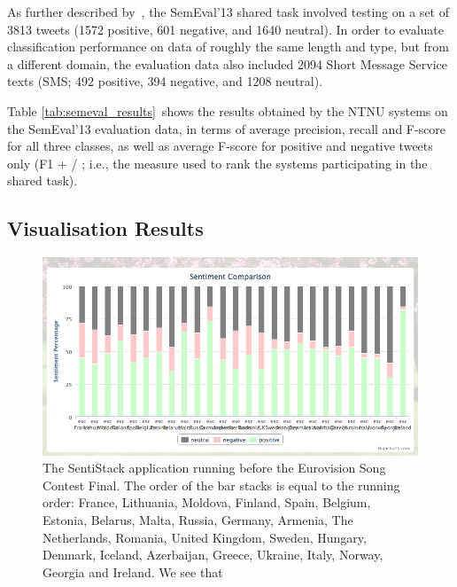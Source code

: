 As further described by~\citet{WilsonEA:13}, the SemEval'13 shared task involved testing on a set of 3813 tweets (1572 positive, 601 negative, and 1640 neutral). In order to evaluate classification performance on data of roughly the same length and type, but from a different domain, the evaluation data also included 2094 Short Message Service texts (SMS; 492 positive, 394 negative, and 1208 neutral).

Table \ref{tab:semeval_results}~shows the results obtained by the NTNU systems on the SemEval'13 evaluation data, in terms of average precision, recall and F-score for all three classes, as well as average F-score for positive and negative tweets only (F1 + / \textendash; i.e., the measure used to rank the systems participating in the shared task).


\subsection{Visualisation Results}



\begin{figure}[!htb]
	\centering
	\includegraphics[width=\linewidth]{../img/sentistack_esc.png}
	\caption[SentiStack running before the Eurovision Song Contest Final]{The SentiStack application running before the Eurovision Song Contest Final. The order of the bar stacks is equal to the running order: France, Lithuania, Moldova, Finland, Spain, Belgium, Estonia, Belarus, Malta, Russia, Germany, Armenia, The Netherlands, Romania, United Kingdom, Sweden, Hungary, Denmark, Iceland, Azerbaijan, Greece, Ukraine, Italy, Norway, Georgia and Ireland. We see that }
	\label{fig:sentistack_esc}
\end{figure}


